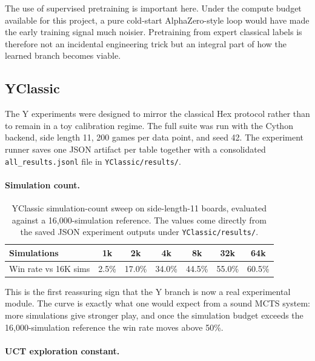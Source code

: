 \documentclass[11pt,a4paper]{article}
\begin{document}
The use of supervised pretraining is important here. Under the compute budget
available for this project, a pure cold-start AlphaZero-style loop would have
made the early training signal much noisier. Pretraining from expert classical
labels is therefore not an incidental engineering trick but an integral part of
how the learned branch becomes viable.

\subsection{YClassic}

The Y experiments were designed to mirror the classical Hex protocol rather
than to remain in a toy calibration regime. The full suite was run with the
Cython backend, side length 11, 200 games per data point, and seed 42. The
experiment runner saves one JSON artifact per table together with a
consolidated \texttt{all\_results.jsonl} file in \texttt{YClassic/results/}.

\paragraph{Simulation count.}

\begin{table}[t]
\centering
\small
\begin{tabular}{@{}lcccccc@{}}
\toprule
Simulations & 1k & 2k & 4k & 8k & 32k & 64k \\
\midrule
Win rate vs 16K sims & 2.5\% & 17.0\% & 34.0\% & 44.5\% & 55.0\% & 60.5\% \\
\bottomrule
\end{tabular}
\caption{YClassic simulation-count sweep on side-length-11 boards, evaluated
against a 16{,}000-simulation reference. The values come directly from the
saved JSON experiment outputs under \texttt{YClassic/results/}.}
\label{tab:yclassic-simulations}
\end{table}

This is the first reassuring sign that the Y branch is now a real experimental
module. The curve is exactly what one would expect from a sound MCTS system:
more simulations give stronger play, and once the simulation budget exceeds the
16{,}000-simulation reference the win rate moves above 50\%.

\paragraph{UCT exploration constant.}
\end{document}
